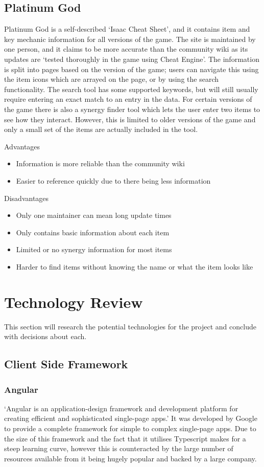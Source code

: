 \subsection*{Platinum God}
Platinum God is a self-described `Isaac Cheat Sheet'\cite{IsaacCheatSheet}, and it contains item and key mechanic 
information for all versions of the game. The site is maintained by one person, and it claims to be more accurate than 
the community wiki as its updates are `tested thoroughly in the game using Cheat Engine'\cite{FrequentlyAskedQuestions}. 
The information is split into pages based on the version of the game; users can navigate this using the item icons which
 are arrayed on the page, or by using the search functionality. The search tool has some supported keywords, but will 
still usually require entering an exact match to an entry in the data. For certain versions of the game there is also a 
synergy finder tool which lets the user enter two items to see how they interact. However, this is limited to older 
versions of the game and only a small set of the items are actually included in the tool. \par
Advantages
\begin{itemize}
    \item Information is more reliable than the community wiki
    \item Easier to reference quickly due to there being less information
\end{itemize}
Disadvantages
\begin{itemize}
    \item Only one maintainer can mean long update times
    \item Only contains basic information about each item
    \item Limited or no synergy information for most items
    \item Harder to find items without knowing the name or what the item looks like
\end{itemize}
\section{Technology Review}
This section will research the potential technologies for the project and conclude with decisions about each.
\subsection{Client Side Framework}
\subsubsection*{Angular}
`Angular is an application-design framework and development platform for creating efficient and sophisticated 
single-page apps.'\cite{AngularIntroductionAngular} It was developed by Google to provide a complete framework for 
simple to complex single-page apps. Due to the size of this framework and the fact that it utilises Typescript makes for
 a steep learning curve, however this is counteracted by the large number of resources available from it being hugely 
popular and backed by a large company.
